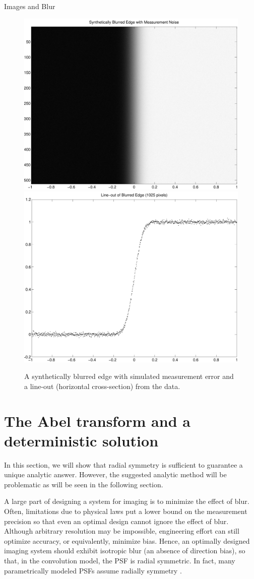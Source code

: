 \begin{chapter}{Images and Blur}
\begin{figure}
\begin{center}
  \includegraphics[width=.45\textwidth]{figures/blurredEdgeData.pdf}
  \includegraphics[width=.45\textwidth]{figures/psfLineoutData.pdf}
  \caption{A synthetically blurred edge with simulated measurement error and a line-out (horizontal cross-section) from the data.} \label{fig:edgeData}
\end{center}
\end{figure}
  
\section{The Abel transform and a deterministic solution}
  In this section, we will show that radial symmetry is sufficient to guarantee a unique analytic answer.
  However, the suggested analytic method will be problematic as will be seen in the following section.

  A large part of designing a system for imaging is to minimize the effect of blur.
  Often, limitations due to physical laws put a lower bound on the measurement precision so that even an optimal design cannot ignore the effect of blur.
  Although arbitrary resolution may be impossible, engineering effort can still optimize accuracy, or equivalently, minimize bias.
  Hence, an optimally designed imaging system should exhibit isotropic blur (an absence of direction bias), so that, in the convolution model, the PSF is radial symmetric.
  In fact, many parametrically modeled PSFs assume radially symmetry \citep{doering1992,jain1989,kundur1996blind,watson1993}.  


\end{chapter}
